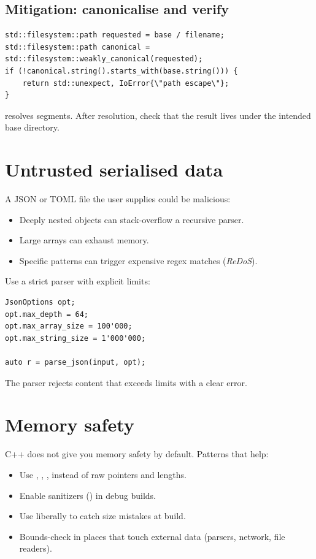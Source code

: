 \subsection*{Mitigation: canonicalise and verify}

\begin{lstlisting}
std::filesystem::path requested = base / filename;
std::filesystem::path canonical = std::filesystem::weakly_canonical(requested);
if (!canonical.string().starts_with(base.string())) {
    return std::unexpect, IoError{\"path escape\"};
}
\end{lstlisting}

 resolves  segments. After
resolution, check that the result lives under the intended
base directory.

\section{Untrusted serialised data}

A JSON or TOML file the user supplies could be malicious:

\begin{itemize}[leftmargin=*]
  \item Deeply nested objects can stack-overflow a recursive
    parser.
  \item Large arrays can exhaust memory.
  \item Specific patterns can trigger expensive regex matches
    (\emph{ReDoS}).
\end{itemize}

Use a strict parser with explicit limits:

\begin{lstlisting}
JsonOptions opt;
opt.max_depth = 64;
opt.max_array_size = 100'000;
opt.max_string_size = 1'000'000;

auto r = parse_json(input, opt);
\end{lstlisting}

The parser rejects content that exceeds limits with a clear
error.

\section{Memory safety}

C++ does not give you memory safety by default. Patterns that
help:

\begin{itemize}[leftmargin=*]
  \item Use , ,
    ,  instead of raw
    pointers and lengths.
  \item Enable sanitizers ()
    in debug builds.
  \item Use  liberally to catch size
    mistakes at build.
  \item Bounds-check in places that touch external data
    (parsers, network, file readers).
\end{itemize}

